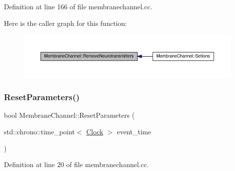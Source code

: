 Definition at line 166 of file membranechannel.\+cc.

Here is the caller graph for this function\+:\nopagebreak
\begin{figure}[H]
\begin{center}
\leavevmode
\includegraphics[width=350pt]{class_membrane_channel_a37f22ddd877e3be7b353048149a7bbcd_icgraph}
\end{center}
\end{figure}
\mbox{\label{class_membrane_channel_a5982040b46efe5e2b824d1cf4dead25e}} 
\subsubsection{\texorpdfstring{Reset\+Parameters()}{ResetParameters()}}
{\footnotesize\ttfamily bool Membrane\+Channel\+::\+Reset\+Parameters (\begin{DoxyParamCaption}\item[{std\+::chrono\+::time\+\_\+point$<$ \hyperlink{universe_8h_a0ef8d951d1ca5ab3cfaf7ab4c7a6fd80}{Clock} $>$}]{event\+\_\+time }\end{DoxyParamCaption})}



Definition at line 20 of file membranechannel.\+cc.

